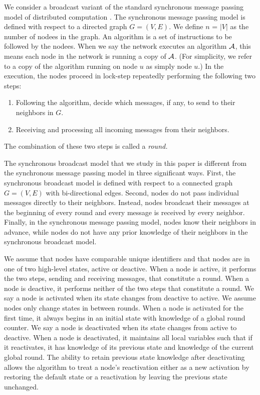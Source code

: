 \documentclass[english]{article}
\begin{document}
We consider a broadcast variant of the standard synchronous message passing model of distributed computation \cite{Lynch:1996, Kuhn:2010}. The synchronous message passing model is defined with respect to a directed graph $G=(V,E)$. We define $n$ = $|V|$ as the number of nodees in the graph. An algorithm is a set of instructions to be followed by the nodees. When we say the network executes an algorithm $\cal A$, this means each node in the network is running a copy of $\cal A$. (For simplicity, we refer to a copy of the algorithm running on node $u$ as simply node $u$.) In the execution, the nodes proceed in lock-step repeatedly performing the following two steps:
\begin{enumerate}
  \item Following the algorithm, decide which messages, if any, to send to their neighbors in $G$.
  \item Receiving and processing all incoming messages from their neighbors.
\end{enumerate}
The combination of these two steps is called a \em round\em.

The synchronous broadcast model that we study in this paper is different from the synchronous message passing model in three significant ways. First, the synchronous broadcast model is defined with respect to a connected graph $G=(V,E)$ with bi-directional edges. Second, nodes do not pass individual messages directly to their neighbors. Instead, nodes broadcast their messages at the beginning of every round and every message is received by every neighbor. Finally, in the synchronous message passing model, nodes know their neighbors in advance, while nodes do not have any prior knowledge of their neighbors in the synchronous broadcast model.

We assume that nodes have comparable unique identifiers and that nodes are in one of two high-level states, active or deactive. When a node is active, it performs the two steps, sending and receiving messages, that constitute a round. When a node is deactive, it performs neither of the two steps that constitute a round. We say a node is activated when its state changes from deactive to active. We assume nodes only change states in between rounds. When a node is activated for the first time, it always begins in an initial state with knowledge of a global round counter. We say a node is deactivated when its state changes from active to deactive. When a node is deactivated, it maintains all local variables such that if it reactivates, it has knowledge of its previous state and knowledge of the current global round. The ability to retain previous state knowledge after deactivating allows the algorithm to treat a node's reactivation either as a new activation by restoring the default state or a reactivation by leaving the previous state unchanged.
\end{document}
